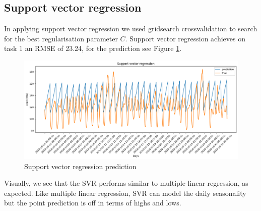 \subsection{Support vector regression}
In applying support vector regression we used gridsearch crossvalidation to search for the best regularisation parameter $C$. Support vector regression achieves on task 1 an RMSE of 23.24, for the prediction see Figure \ref{fig:svr_price}.
\begin{figure}[!ht]
    \includegraphics[width=\textwidth]{images/svr_price.png}
    \caption{Support vector regression prediction}
    \label{fig:svr_price}
\end{figure}
Visually, we see that the SVR performs similar to multiple linear regression, as expected. Like multiple linear regression, SVR can model the daily seasonality but the point prediction is off in terms of highs and lows.


